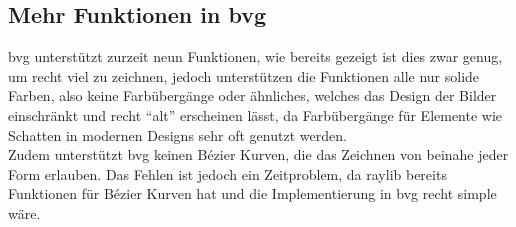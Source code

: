 \subsection{Mehr Funktionen in bvg}
bvg unterstützt zurzeit neun Funktionen, wie bereits gezeigt ist dies zwar genug, um recht viel zu zeichnen, jedoch unterstützen die Funktionen alle nur solide Farben, also keine Farbübergänge oder ähnliches, welches das Design der Bilder einschränkt und recht ``alt'' erscheinen lässt, da Farbübergänge für Elemente wie Schatten in modernen Designs sehr oft genutzt werden.\\
Zudem unterstützt bvg keinen Bézier Kurven, die das Zeichnen von beinahe jeder Form erlauben. Das Fehlen ist jedoch ein Zeitproblem, da raylib bereits Funktionen für Bézier Kurven hat und die Implementierung in bvg recht simple wäre.

